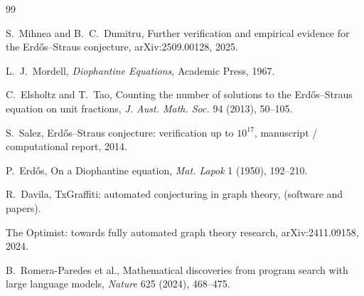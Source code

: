 \documentclass[11pt,a4paper]{ctexart}
\theoremstyle{definition}
\theoremstyle{remark}
\begin{document}
\begin{thebibliography}{99}
\small

S.~Mihnea and B.~C.~Dumitru,
\newblock Further verification and empirical evidence for the Erdős--Straus conjecture,
\newblock arXiv:2509.00128, 2025.

L.~J.~Mordell,
\newblock \emph{Diophantine Equations},
\newblock Academic Press, 1967.

C.~Elsholtz and T.~Tao,
\newblock Counting the number of solutions to the Erdős--Straus equation on unit fractions,
\newblock \emph{J. Aust. Math. Soc.} 94 (2013), 50--105.

S.~Salez,
\newblock Erdős--Straus conjecture: verification up to $10^{17}$,
\newblock manuscript / computational report, 2014.

P.~Erdős,
\newblock On a Diophantine equation,
\newblock \emph{Mat. Lapok} 1 (1950), 192--210.

R.~Davila,
\newblock TxGraffiti: automated conjecturing in graph theory,
 (software and papers).

The Optimist: towards fully automated graph theory research,
\newblock arXiv:2411.09158, 2024.

B.~Romera-Paredes et al.,
\newblock Mathematical discoveries from program search with large language models,
\newblock \emph{Nature} 625 (2024), 468--475.

\end{thebibliography}
\end{document}
